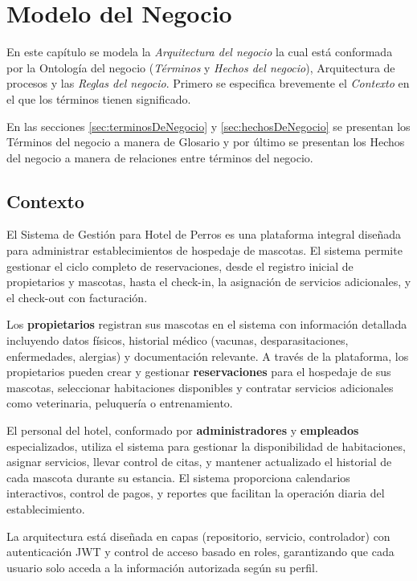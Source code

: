 \chapter{Modelo del Negocio}	
\label{cap:modeloNegocio}

	En este capítulo se modela la {\em Arquitectura del negocio} la cual está conformada por la Ontología del negocio ({\em Términos} y {\em Hechos del negocio}), Arquitectura de procesos y las {\em Reglas del negocio}. Primero se especifica brevemente el {\em Contexto} en el que los términos tienen significado.
	
	En las secciones \ref{sec:terminosDeNegocio} y \ref{sec:hechosDeNegocio} se presentan los Términos del negocio a manera de Glosario y por último se presentan los Hechos del negocio a manera de relaciones entre términos del negocio.

\section{Contexto}

	El Sistema de Gestión para Hotel de Perros es una plataforma integral diseñada para administrar establecimientos de hospedaje de mascotas. El sistema permite gestionar el ciclo completo de reservaciones, desde el registro inicial de propietarios y mascotas, hasta el check-in, la asignación de servicios adicionales, y el check-out con facturación.
	
	Los {\bf propietarios} registran sus mascotas en el sistema con información detallada incluyendo datos físicos, historial médico (vacunas, desparasitaciones, enfermedades, alergias) y documentación relevante. A través de la plataforma, los propietarios pueden crear y gestionar {\bf reservaciones} para el hospedaje de sus mascotas, seleccionar habitaciones disponibles y contratar servicios adicionales como veterinaria, peluquería o entrenamiento.
	
	El personal del hotel, conformado por {\bf administradores} y {\bf empleados} especializados, utiliza el sistema para gestionar la disponibilidad de habitaciones, asignar servicios, llevar control de citas, y mantener actualizado el historial de cada mascota durante su estancia. El sistema proporciona calendarios interactivos, control de pagos, y reportes que facilitan la operación diaria del establecimiento.
	
	La arquitectura está diseñada en capas (repositorio, servicio, controlador) con autenticación JWT y control de acceso basado en roles, garantizando que cada usuario solo acceda a la información autorizada según su perfil.
	
